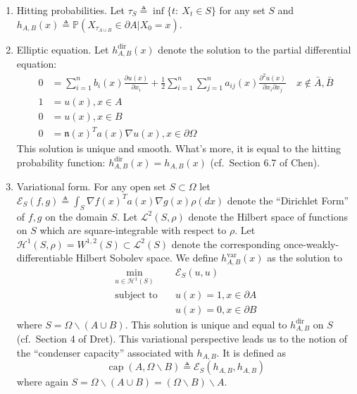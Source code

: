 \documentclass[nofootinbib,english, aip, jcp, priprint, graphicx,floatfix]{revtex4-1}
\theoremstyle{plain}
\theoremstyle{definition}
\theoremstyle{plain}
\newcommand{\normal}{{\mathfrak{n}}}
\newcommand{\capac}[2]{\ensuremath{\operatorname{cap}}(#1,#2)}
\begin{document}
\begin{enumerate}
\item Hitting probabilities.  Let $\tau_S \triangleq \inf\{t:\ X_t \in S\}$ for any set $S$ and $h_{A,B}(x) \triangleq \mathbb{P}(X_{\tau_{A\cup B}}\in \partial A|X_0=x)$.
    
\item Elliptic equation.  Let $h^\mathrm{dir}_{A,B}(x)$ denote the solution to the partial differential equation:
	    \begin{align}\label{eq:pde}
    0 &= \sum_{i = 1}^n b_i (x) \frac{\partial u
        (x)}{\partial x_i} + \frac{1}{2} \sum_{i = 1}^n \sum_{j = 1}^n a_{ij} (x)
        \frac{\partial^2 u (x)}{\partial x_i \partial x_j}\quad x\notin \bar A,\bar B\\
    1 &= u(x),x\in  A \nonumber \\ 
    0 &= u(x),x\in  B \nonumber \\
    0 &= \normal(x)^Ta(x)\nabla u(x), x \in \partial{\Omega} 
    \nonumber
    \end{align}
This solution is unique and smooth.\cite{lieberman1986mixed}  What's more, it is equal to the hitting probability function: $h^\mathrm{dir}_{A,B}(x)=h_{A,B}(x)$ (cf.\ Section 6.7 of Chen\cite{chen2012symmetric}).
\item Variational form.  For any open set $S\subset \Omega$ let $\mathscr{E}_{S}(f,g)\triangleq \int_S \nabla f(x)^T a(x) \nabla g(x) \rho(dx)$ denote the ``Dirichlet Form'' of $f,g$ on the domain $S$.  Let $\mathscr L^2(S,\rho)$ denote the Hilbert space of functions on $S$ which are square-integrable with respect to $\rho$.  Let $\mathcal{H}^1(S,\rho)=W^{1,2}(S) \subset \mathscr{L}^2(S)$ denote the corresponding once-weakly-differentiable Hilbert Sobolev space.  We define $h^\mathrm{var}_{A,B}(x)$ as the solution to 
    \begin{align*}
    \min_{u \in \mathcal H^1(S)} \quad & \mathscr{E}_S(u,u) \\
    \mbox{subject to} \quad & u(x)=1,x\in \partial A \\
     & u(x)=0,x\in \partial B
    \end{align*}
    where $S=\Omega \backslash (A\cup B)$.  This solution is unique and equal to $h^\mathrm{dir}_{A,B}$ on $S$ (cf.\ Section 4 of Dret\cite{dret2016partial}).  
This variational perspective leads us to the notion of the ``condenser capacity'' associated with $h_{A,B}$.  It is defined as 
    \[
    \capac{A}{\Omega \backslash B} \triangleq \mathscr{E}_S(h_{A,B},h_{A,B})
    \]
    where again $S=\Omega \backslash (A\cup B)=(\Omega \backslash B) \backslash A$.  
\end{enumerate}
\end{document}
